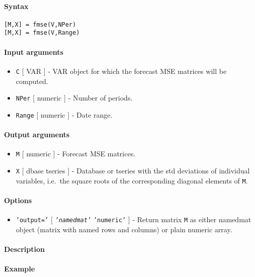 


	\paragraph{Syntax}

\begin{verbatim}
[M,X] = fmse(V,NPer)
[M,X] = fmse(V,Range)
\end{verbatim}

\paragraph{Input arguments}

\begin{itemize}
\item
  \texttt{C} {[} VAR {]} - VAR object for which the forecast MSE
  matrices will be computed.
\item
  \texttt{NPer} {[} numeric {]} - Number of periods.
\item
  \texttt{Range} {[} numeric {]} - Date range.
\end{itemize}

\paragraph{Output arguments}

\begin{itemize}
\item
  \texttt{M} {[} numeric {]} - Forecast MSE matrices.
\item
  \texttt{X} {[} dbase \textbar{} tseries {]} - Database or tseries with
  the std deviations of individual variables, i.e.~the square roots of
  the corresponding diagonal elements of \texttt{M}.
\end{itemize}

\paragraph{Options}

\begin{itemize}
\itemsep1pt\parskip0pt
\item
  \texttt{'output='} {[} \emph{\texttt{'namedmat'}} \textbar{}
  \texttt{'numeric'} {]} - Return matrix \texttt{M} as either namedmat
  object (matrix with named rows and columns) or plain numeric array.
\end{itemize}

\paragraph{Description}

\paragraph{Example}


